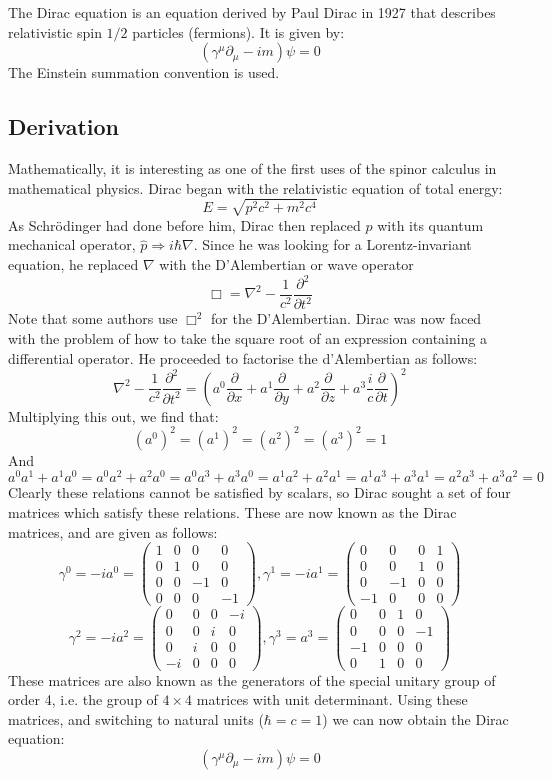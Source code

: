 \documentclass[12pt]{article}
\begin{document}
The Dirac equation is an equation derived by Paul Dirac in 1927 that describes relativistic spin $1/2$ particles (fermions). It is given by:
\[
(\gamma^\mu \partial_\mu - im)\psi = 0
\]
The Einstein summation convention is used.
\subsection{Derivation}
Mathematically, it is interesting as one of the first uses of the spinor calculus in mathematical physics. Dirac began with the relativistic equation of total energy:
\[
E = \sqrt{p^2c^2 + m^2c^4}
\]
As Schr\"odinger had done before him, Dirac then replaced $p$ with its quantum mechanical operator, $\hat{p} \Rightarrow i\hbar \nabla$. Since he was looking for a Lorentz-invariant equation, he replaced $\nabla$ with the D'Alembertian or wave operator
\[
\Box = \nabla^2 - \frac{1}{c^2} \frac{\partial^2}{\partial t^2}
\]
Note that some authors use $\Box^2$ for the D'Alembertian. Dirac was now faced with the problem of how to take the square root of an expression containing a differential operator. He proceeded to factorise the d'Alembertian as follows:
\[
\nabla^2 - \frac{1}{c^2} \frac{\partial^2}{\partial t^2} = (a^0 \frac{\partial}{\partial x} + a^1 \frac{\partial}{\partial y} + a^2 \frac{\partial}{\partial z} + a^3\frac{i}{c} \frac{\partial}{\partial t})^2
\]
Multiplying this out, we find that:
\[
(a^0)^2 = (a^1)^2 = (a^2)^2 = (a^3)^2 = 1
\]
And
\[
a^0a^1 + a^1a^0 = a^0a^2 + a^2a^0 = a^0a^3 + a^3a^0 = a^1a^2 + a^2a^1 = a^1a^3 + a^3a^1 = a^2a^3 + a^3a^2 = 0
\]
Clearly these relations cannot be satisfied by scalars, so Dirac sought a set of four matrices which satisfy these relations.  These are now known as the Dirac matrices, and are given as follows:
\[
\gamma^0 = -ia^0 = 
\begin{pmatrix} 
1 & 0 & 0 & 0 \\
0 & 1 & 0 & 0 \\ 
0 & 0 & -1 & 0 \\
0 & 0 & 0 & -1 \end{pmatrix},
\gamma^1 = -ia^1 = 
\begin{pmatrix}
0 & 0 & 0 & 1 \\
0 & 0 & 1 & 0 \\
0 & -1 & 0 & 0 \\
-1 & 0 & 0 & 0 \end{pmatrix}
\]
\[
\gamma^2 = -ia^2 =
\begin{pmatrix}
0 & 0 & 0 & -i \\
0 & 0 & i & 0 \\
0 & i & 0 & 0 \\
-i & 0 & 0 & 0 \end{pmatrix},
\gamma^3 = a^3 =
\begin{pmatrix}
0 & 0 & 1 & 0 \\
0 & 0 & 0 & -1 \\
-1 & 0 & 0 & 0 \\
0 & 1 & 0 & 0 \end{pmatrix}
\]
These matrices are also known as the generators of the special unitary group of order 4, i.e. the group of $4 \times 4$ matrices with unit determinant.
Using these matrices, and switching to natural units ($\hbar = c = 1$) we can now obtain the Dirac equation:
\[
(\gamma^\mu \partial_\mu - im)\psi = 0
\]
\end{document}
